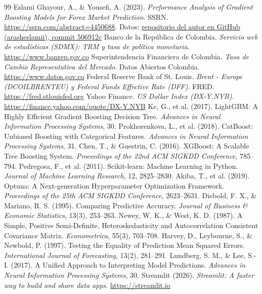 \documentclass[11pt,letterpaper]{article}
\begin{document}
\begin{thebibliography}{99}
\small
{} Eslami Ghayour, A., \& Yousefi, A. (2023). \textit{Performance Analysis of Gradient Boosting Models for Forex Market Prediction}. SSRN. \url{https://ssrn.com/abstract=4450688}. Datos: \href{https://github.com/arasheslamii/1-Performance-comparison-of-Gradient-Boosting-algorithms-for-Forex-market-Prediction-A-Study-on-Lig}{repositorio del autor en GitHub (arasheslamii), commit 506912c}
 Banco de la República de Colombia. \textit{Servicio web de estadísticas (SDMX): TRM y tasa de política monetaria}. \url{https://www.banrep.gov.co}
 Superintendencia Financiera de Colombia. \textit{Tasa de Cambio Representativa del Mercado}. Datos Abiertos Colombia. \url{https://www.datos.gov.co}
 Federal Reserve Bank of St. Louis. \textit{Brent - Europe (DCOILBRENTEU) y Federal Funds Effective Rate (DFF)}. FRED. \url{https://fred.stlouisfed.org}
 Yahoo Finance. \textit{US Dollar Index (DX-Y.NYB)}. \url{https://finance.yahoo.com/quote/DX-Y.NYB}
 Ke, G., et al. (2017). LightGBM: A Highly Efficient Gradient Boosting Decision Tree. \textit{Advances in Neural Information Processing Systems}, 30.
 Prokhorenkova, L., et al. (2018). CatBoost: Unbiased Boosting with Categorical Features. \textit{Advances in Neural Information Processing Systems}, 31.
 Chen, T., \& Guestrin, C. (2016). XGBoost: A Scalable Tree Boosting System. \textit{Proceedings of the 22nd ACM SIGKDD Conference}, 785--794.
 Pedregosa, F., et al. (2011). Scikit-learn: Machine Learning in Python. \textit{Journal of Machine Learning Research}, 12, 2825--2830.
 Akiba, T., et al. (2019). Optuna: A Next-generation Hyperparameter Optimization Framework. \textit{Proceedings of the 25th ACM SIGKDD Conference}, 2623--2631.
 Diebold, F. X., \& Mariano, R. S. (1995). Comparing Predictive Accuracy. \textit{Journal of Business \& Economic Statistics}, 13(3), 253--263.
 Newey, W. K., \& West, K. D. (1987). A Simple, Positive Semi-Definite, Heteroskedasticity and Autocorrelation Consistent Covariance Matrix. \textit{Econometrica}, 55(3), 703--708.
 Harvey, D., Leybourne, S., \& Newbold, P. (1997). Testing the Equality of Prediction Mean Squared Errors. \textit{International Journal of Forecasting}, 13(2), 281--291.
 Lundberg, S. M., \& Lee, S.-I. (2017). A Unified Approach to Interpreting Model Predictions. \textit{Advances in Neural Information Processing Systems}, 30.
 Streamlit (2026). \textit{Streamlit: A faster way to build and share data apps}. \url{https://streamlit.io}
\end{thebibliography}
\end{document}
